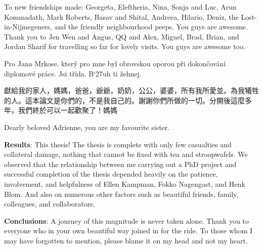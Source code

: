 \noindent To new friendships made: Georgeta, Eleftheria, Nina, Sonja and Luc, Arun Kommadath, Mark Roberts, Basav and Shital, Andreea, Hilario, Deniz, the Lost-in-Nijmegeners, and the friendly neighbourhood peeps. You guys are awesome. Thank you to Jen Wen and Angus, QQ and Alex, Miguel, Brad, Brian, and Jordan Sharif for travelling so far for lovely visits. You guys are awesome too.

\noindent Pro Jana Mrkose, kter{\' y} pro mne byl obrovskou oporou p{\v r}i dokon{\v c}ov{\' a}n{\' i} diplomov{\' e} pr{\' a}ce.
Jsi t{\v r}{\' i}da. B{\accent`27u}h ti {\v z}ehnej.

\noindent
\begin{CJK}{UTF8}{gbsn}
獻給我的家人，媽媽，爸爸，爺爺，奶奶，公公，婆婆，所有我所愛並。為我犧牲的人。這本論文是你們的，不是我自己的。謝謝你們所做的一切。分開後這麼多年，我們終於可以一起歡聚了！媽媽
\end{CJK} Dearly beloved Adrienne, you are my favourite sister.

\noindent \textbf{Results}: This thesis! The thesis is complete with only few casualties and collateral damage, nothing that cannot be fixed with tea and stroopwafels. We observed that the relationship between me carrying out a PhD project and successful completion of the thesis depended heavily on the patience, involvement, and helpfulness of Ellen Kampman, Fokko Nagengast, and Henk Blom. And also on numerous other factors such as beautiful friends, family, colleagues, and collaborators.

\noindent \textbf{Conclusions}: A journey of this magnitude is never taken alone. Thank you to everyone who in your own beautiful way joined in for the ride. To those whom I may have forgotten to mention, please blame it on my head and not my heart.
